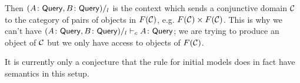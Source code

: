 \documentclass[fleqn,leqno]{article}
\begin{document}
Then $(A \colon \mathsf{Query}, B \colon \mathsf{Query})/_l$ is the context which sends a conjunctive domain $\mathcal{C}$ to the category of pairs of objects in $F(\mathcal{C})$, e.g. $F(\mathcal{C}) \times F(\mathcal{C})$. This is why we can't have $(A \colon \mathsf{Query}, B \colon \mathsf{Query})/_l \vdash_c A \colon \mathsf{Query}$; we are trying to produce an object of $\mathcal{C}$ but we only have access to objects of $F(\mathcal{C})$.

It is currently only a conjecture that the rule for initial models does in fact have semantics in this setup.



\end{document}
